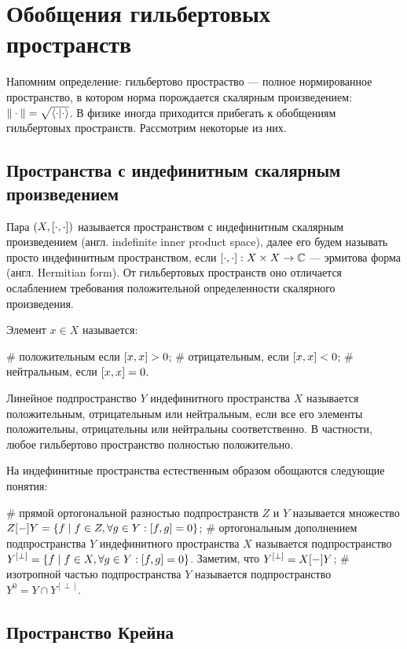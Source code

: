 \section{Обобщения гильбертовых пространств}
Напомним определение: гильбертово простраство — полное нормированное пространство, в котором норма порождается скалярным произведением: $\|\cdot\| = \sqrt{\ip{\cdot}{\cdot}}$. В физике иногда приходится прибегать к обобщениям гильбертовых пространств. Рассмотрим некоторые из них.

\subsection{Пространства с индефинитным скалярным произведением}
Пара $(X, [\cdot,\cdot])$ называется пространством с индефинитным скалярным произведением (англ. indefinite inner product space), далее его будем называть просто индефинитным пространством, если $[\cdot,\cdot]: X \times X \to \mathbb{C}$ — эрмитова форма (англ. Hermitian form). От гильбертовых пространств оно отличается ослаблением требования положительной определенности скалярного произведения.

Элемент $x \in X$ называется:
\begin{ilist}
# положительным если $[x,x] > 0$;
# отрицательным, если $[x,x] < 0$;
# нейтральным, если $[x,x] = 0$.
\end{ilist}

Линейное подпространство $Y$ индефинитного пространства $X$ называется положительным, отрицательным или нейтральным, если все его элементы положительны, отрицательны или нейтральны соответственно. В частности, любое гильбертово пространство полностью положительно.

На индефинитные пространства естественным образом обощаются следующие понятия:
\begin{ilist}
# прямой ортогональной разностью подпространств $Z$ и $Y$ называется множество $Z [-] Y = \{f \mid f \in Z, \forall g \in Y: [f,g] = 0 \}$;
# ортогональным дополнением подпространства $Y$ индефинитного пространства $X$ называется подпространство $Y^{[\perp]} = \{f \mid f \in X, \forall g \in Y: [f,g] = 0 \}$. Заметим, что $Y^{[\perp]} = X [-] Y$;
# изотропной частью подпространства $Y$ называется подпространство $Y^0 = Y \cap Y^{[\perp]}$.
\end{ilist}

\subsection{Пространство Крейна}

